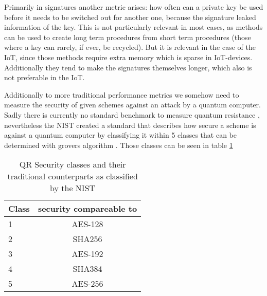 \documentclass[conference]{IEEEtran}
\begin{document}
Primarily in signatures another metric arises: how often can a private key be used before it needs to be switched out for another one, because the signature leaked information of the key.
This is not particularly relevant in most cases, as methods can be used to create long term procedures from short term procedures (those where a key can rarely, if ever, be recycled).
But it is relevant in the case of the IoT, since those methods require extra memory which is sparse in IoT-devices. Additionally they tend to make the signatures themselves longer, which also is not preferable in the IoT. \cite{QR_algs}

Additionally to more traditional performance metrics we somehow need to measure the security of given schemes against an attack by a quantum computer.
Sadly there is currently no standard benchmark to measure quantum resistance \cite{QR_comparison}, nevertheless the NIST created a standard that describes how secure a scheme is against a quantum computer by classifying it within 5 classes that can be determined with grovers algorithm \cite{QR_Iot_Lattice,Energy_comp}.
Those classes can be seen in table \ref{QR-classes}

\begin{table}
    \label{QR-classes}
    \centering
    \caption{QR Security classes and their traditional counterparts as classified by the NIST}
    \begin{tabular}{|l | c|}
        \hline
        Class & security compareable to \\
        \hline
        1 & AES-128 \\
        2 & SHA256 \\
        3 & AES-192 \\
        4 & SHA384 \\
        5 & AES-256 \\
        \hline
    \end{tabular} 
\end{table}
\end{document}
